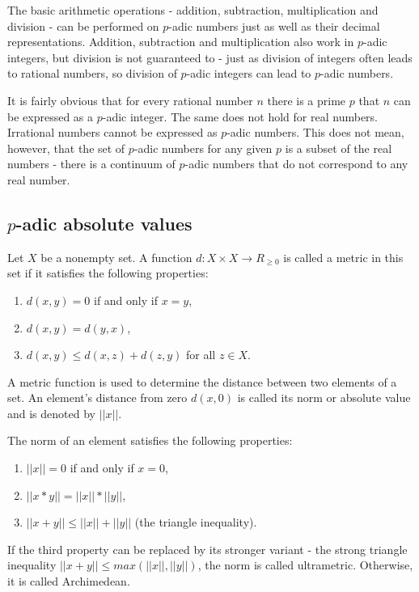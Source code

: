 \documentclass{llncs}
\begin{document}
The basic arithmetic operations - addition, subtraction, multiplication and division - can be performed on $p$-adic numbers just as well as their decimal representations. Addition, subtraction and multiplication also work in $p$-adic integers, but division is not guaranteed to - just as division of integers often leads to rational numbers, so division of $p$-adic integers can lead to $p$-adic numbers.

It is fairly obvious that for every rational number $n$ there is a prime $p$ that $n$ can be expressed as a $p$-adic integer. The same does not hold for real numbers. Irrational numbers cannot be expressed as $p$-adic numbers. This does not mean, however, that the set of $p$-adic numbers for any given $p$ is a subset of the real numbers - there is a continuum of $p$-adic numbers that do not correspond to any real number. \cite{Rus12}
\subsection{$p$-adic absolute values}
Let $X$ be a nonempty set. A function $d: X \times X \rightarrow R_{\geq 0}$ is called a metric in this set if it satisfies the following properties:
\begin{enumerate}
\item $d(x,y) = 0$ if and only if $x = y$,\\
\item $d(x,y) = d(y,x)$,\\
\item $d(x,y) \leq d(x,z) + d(z,y)$ for all $z \in X$.
\end{enumerate}
A metric function is used to determine the distance between two elements of a set. An element's distance from zero $d(x,0)$ is called its norm or absolute value and is denoted by $||x||$.

The norm of an element satisfies the following properties:
\begin{enumerate}
\item $||x||=0$ if and only if $x=0$,\\
\item $||x*y|| = ||x||*||y||$,\\
\item $||x+y|| \leq ||x||+||y||$ (the triangle inequality).
\end{enumerate}
If the third property can be replaced by its stronger variant - the strong triangle inequality $||x+y|| \leq max(||x||,||y||)$, the norm is called ultrametric. Otherwise, it is called Archimedean. \cite{Rus12}
\end{document}
